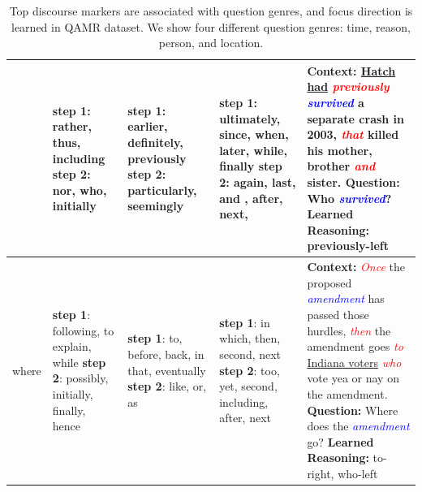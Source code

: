\begin{table}[t]
{\begin{tabular}{|p{1.8cm}|p{2.5cm}|p{2.5cm}|p{2.5cm}|p{5.8cm}|}
	& \textbf{step 1}: rather, thus, including \newline\newline\textbf{step 2}: nor, who, initially &\textbf{step 1}: earlier, definitely, previously \newline\newline\textbf{step 2}: particularly, seemingly
		&\textbf{step 1}: ultimately, since, when, later, while, finally \newline \textbf{step 2}:  again, last, and , after, next, 
	& \textbf{Context: }\underline{Hatch had} \textit{\textcolor{red}{previously}} \textit{\textcolor{blue}{survived}} a separate crash in 2003, \textit{\textcolor{red}{that}} killed his mother, brother \textit{\textcolor{red}{and}} sister.
  \newline \textbf{Question: }Who \textit{\textcolor{blue}{survived}}?\newline \textbf{Learned Reasoning: }previously-left\\ 
	\hline
  where 
 
  
	 &\textbf{step 1}: following, to explain, while \newline\newline\textbf{step 2}: possibly, initially, finally, hence &\textbf{step 1}: to, before, back, in that, eventually \newline\textbf{step 2}: like, or, as & \textbf{step 1}: in which, then, second, next \newline\newline \textbf{step 2}: too, yet, second, including, after, next
  & \textbf{Context: }\textit{\textcolor{red}{Once}} the proposed \textit{\textcolor{blue}{amendment}} has passed those hurdles, \textit{\textcolor{red}{then}} the amendment goes \textit{\textcolor{red}{to}} \underline{Indiana voters} \textit{\textcolor{red}{who}} vote yea or nay on the amendment. 
  \newline \textbf{Question: }Where does the \textit{\textcolor{blue}{amendment}} go?
  \newline \textbf{Learned Reasoning: }to-right, who-left\\ 
 \hline
\end{tabular}
}
\caption{\fontsize{9}{12}\selectfont Top discourse markers are associated with question genres, and focus direction is learned in \textsc{QAMR} dataset. We show four different question genres: time, reason, person, and location.}
\label{tab:disc_phrase}
\vspace{-3ex}
\end{table}

